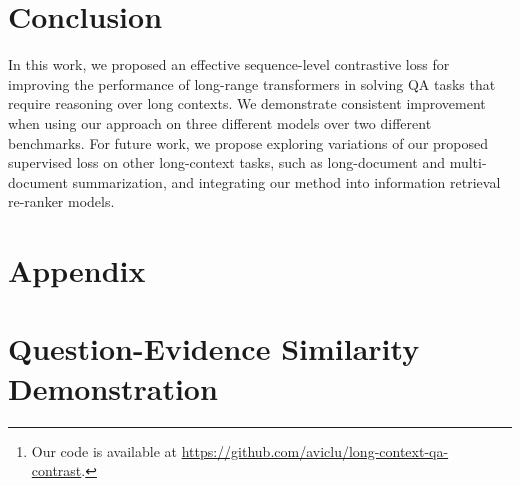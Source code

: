 

\section{Conclusion}
In this work, we proposed an effective sequence-level contrastive loss for improving the performance of long-range transformers in solving QA tasks that require reasoning over long contexts. We demonstrate consistent improvement when using our approach on three different models over two different benchmarks.
For future work, we propose exploring variations of our proposed supervised loss on other long-context tasks, such as long-document and multi-document summarization, and integrating our method into information retrieval re-ranker models.







\clearpage
\appendix




\begin{abstract}
Long-context question answering (QA) tasks require reasoning over a long document or multiple documents. Addressing these tasks often benefits from identifying a set of evidence spans (e.g., sentences), which provide supporting evidence for answering the question.
In this work, we propose a novel method for equipping long-context QA models with an additional sequence-level objective for better identification of the supporting evidence.
We achieve this via an additional contrastive supervision signal in finetuning, where the model is encouraged to explicitly discriminate supporting evidence sentences from negative ones by maximizing question-evidence similarity. 
The proposed additional loss exhibits consistent improvements on three different strong long-context transformer models, across two challenging question answering benchmarks -- HotpotQA and QAsper.\footnote{Our code is available at \url{https://github.com/aviclu/long-context-qa-contrast}.}
\end{abstract}
\section*{Appendix}

\section{Question-Evidence Similarity Demonstration}
\label{sec:appndx1}

